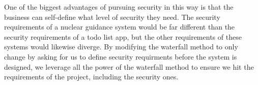 \newpage
One of the biggest advantages of pursuing security in this way is that the business can self-define what level of security they need. The security requirements of a nuclear guidance system would be far different than the security requirements of a todo list app, but the other requirements of these systems would likewise diverge. By modifying the waterfall method to only change by asking for us to define security requirments before the system is designed, we leverage all the power of the waterfall method to ensure we hit the requirements of the project, including the security ones. \\


\vspace{7mm}


